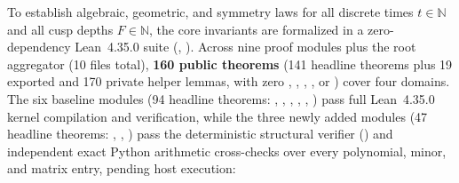 To establish algebraic, geometric, and symmetry laws for all discrete times $t \in \mathbb{N}$ and all cusp depths
$F \in \mathbb{N}$, the core invariants are formalized in a zero-dependency Lean~4.35.0 suite \cite{demoura2021lean4}
(, ). Across nine proof modules plus the root aggregator 
(10  files total), \textbf{160 public theorems} (141 headline theorems plus 19 exported and 170 private
helper lemmas, with zero , , , , or )
cover four domains. The six baseline modules (94 headline theorems: , , ,
, , ) pass full Lean~4.35.0 kernel compilation and 
verification, while the three newly added modules (47 headline theorems: , ,
) pass the deterministic structural verifier () and
independent exact Python arithmetic cross-checks over every polynomial, minor, and matrix entry, pending host
 execution:
